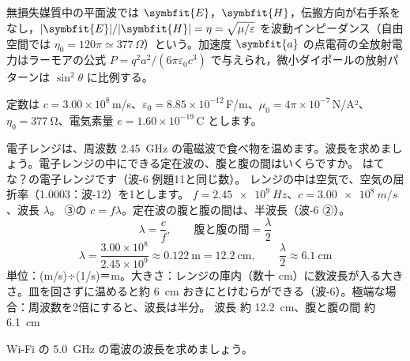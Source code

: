 \begin{senmonsho}[平面波と放射]
\begin{bkhonbun}
無損失媒質中の平面波では $\symbfit{E}$，$\symbfit{H}$，伝搬方向が右手系をなし，$|\symbfit{E}|/|\symbfit{H}|=\eta=\sqrt{\mu/\varepsilon}$ を波動インピーダンス（自由空間では $\eta_0=120\pi\simeq377\,\Omega$）という。加速度 $\symbfit{a}$ の点電荷の全放射電力はラーモアの公式 $P=q^2a^2/(6\pi\varepsilon_0c^3)$ で与えられ，微小ダイポールの放射パターンは $\sin^2\theta$ に比例する。
\end{bkhonbun}
\end{senmonsho}


\noindent 定数は $c=3.00\times10^8$\,m/s、$\varepsilon_0=8.85\times10^{-12}$\,F/m、$\mu_0=4\pi\times10^{-7}$\,N/A²、$\eta_0=\qty{377}{\ohm}$、電気素量 $e=1.60\times10^{-19}$\,C とします。

\begin{phreidai}[電子レンジのマイクロ波の波長]
\label{ph:電-15:ex1}電子レンジは、周波数 \qty{2.45}{GHz} の電磁波で食べ物を温めます。波長を求めましょう。電子レンジの中にできる定在波の、腹と腹の間はいくらですか。
\phbamen
はてな？の電子レンジです（波-6 例題11と同じ数）。
\phmushi
レンジの中は空気で、空気の屈折率（1.0003：波-12）を1とします。
\phzu
$f=\qty{2.45e9}{Hz}$、$c=\qty{3.00e8}{m/s}$、波長 $\lambda$。
\phriyu
③の $c=f\lambda$。定在波の腹と腹の間は、半波長（波-6 ②）。
\phtateru
\[ \lambda=\frac{c}{f},\qquad \text{腹と腹の間}=\frac{\lambda}{2} \]
\phtoku
\[ \lambda=\frac{3.00\times10^8}{2.45\times10^9}\approx0.122\ \mathrm{m}=12.2\ \mathrm{cm},\qquad \frac{\lambda}{2}\approx6.1\ \mathrm{cm} \]
\phtashikame
単位：(m/s)÷(1/s)＝m。大きさ：レンジの庫内（数十 cm）に数波長が入る大きさ。皿を回さずに温めると約 \qty{6}{cm} おきにとけむらができる（波-6）。極端な場合：周波数を2倍にすると、波長は半分。
\kotae 波長 約 \qty{12.2}{cm}、腹と腹の間 約 \qty{6.1}{cm}
\end{phreidai}
\begin{jibun}
Wi-Fi の \qty{5.0}{GHz} の電波の波長を求めましょう。
\end{jibun}


